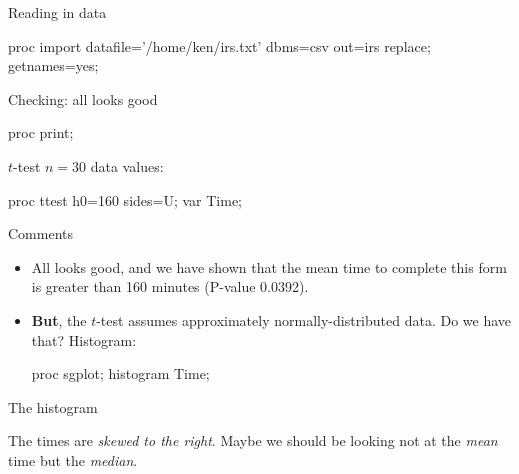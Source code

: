 \documentclass[unknownkeysallowed]{beamer}\usepackage[]{graphicx}\usepackage[]{color}
\begin{document}
\begin{frame}[fragile]{Reading in data}
  
  \begin{Datastep}
proc import
  datafile='/home/ken/irs.txt'
    dbms=csv
    out=irs
    replace;
  getnames=yes;
  \end{Datastep}
  
\end{frame}

\begin{frame}[fragile]{Checking: all looks good}
  
  \begin{Sascode}[store=ij]
proc print;    
  \end{Sascode}
  
  
\end{frame}

\begin{frame}[fragile]{$t$-test}
  $n=30$ data values:
  \begin{Sascode}[store=ik]
proc ttest h0=160 sides=U;
  var Time;
  \end{Sascode}
  
\end{frame}

\begin{frame}[fragile]{Comments}
  
  \begin{itemize}
  \item All looks good, and we have shown that the mean time to
    complete this form is greater than 160 minutes (P-value 0.0392). 
  \item \textbf{But}, the $t$-test assumes approximately
    normally-distributed data. Do we have that? Histogram:
    
    \begin{Sascode}[store=il]
proc sgplot;
  histogram Time;
    \end{Sascode}
  \end{itemize}
  
\end{frame}

\begin{frame}[fragile]{The histogram}
  

The times are \emph{skewed to the right}. Maybe we should be looking
not at the \emph{mean} time but the \emph{median}. 
  
\end{frame}
\end{document}
